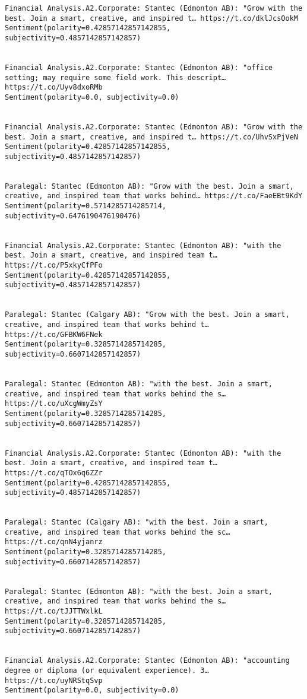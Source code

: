 \documentclass[11pt]{article}
\begin{document}
\begin{Verbatim}[commandchars=\\\{\}]
Financial Analysis.A2.Corporate: Stantec (Edmonton AB): "Grow with the best. Join a smart, creative, and inspired t… https://t.co/dklJcsOokM
Sentiment(polarity=0.42857142857142855, subjectivity=0.4857142857142857)


Financial Analysis.A2.Corporate: Stantec (Edmonton AB): "office setting; may require some field work. This descript… https://t.co/Uyv8dxoRMb
Sentiment(polarity=0.0, subjectivity=0.0)


Financial Analysis.A2.Corporate: Stantec (Edmonton AB): "Grow with the best. Join a smart, creative, and inspired t… https://t.co/UhvSxPjVeN
Sentiment(polarity=0.42857142857142855, subjectivity=0.4857142857142857)


Paralegal: Stantec (Edmonton AB): "Grow with the best. Join a smart, creative, and inspired team that works behind… https://t.co/FaeEBt9KdY
Sentiment(polarity=0.5714285714285714, subjectivity=0.6476190476190476)


Financial Analysis.A2.Corporate: Stantec (Edmonton AB): "with the best. Join a smart, creative, and inspired team t… https://t.co/P5xkyCfPFo
Sentiment(polarity=0.42857142857142855, subjectivity=0.4857142857142857)


Paralegal: Stantec (Calgary AB): "Grow with the best. Join a smart, creative, and inspired team that works behind t… https://t.co/GFBKW6FNek
Sentiment(polarity=0.3285714285714285, subjectivity=0.6607142857142857)


Paralegal: Stantec (Edmonton AB): "with the best. Join a smart, creative, and inspired team that works behind the s… https://t.co/uXcgWmyZsY
Sentiment(polarity=0.3285714285714285, subjectivity=0.6607142857142857)


Financial Analysis.A2.Corporate: Stantec (Edmonton AB): "with the best. Join a smart, creative, and inspired team t… https://t.co/qTOx6q6ZZr
Sentiment(polarity=0.42857142857142855, subjectivity=0.4857142857142857)


Paralegal: Stantec (Calgary AB): "with the best. Join a smart, creative, and inspired team that works behind the sc… https://t.co/qnN4yjanrz
Sentiment(polarity=0.3285714285714285, subjectivity=0.6607142857142857)


Paralegal: Stantec (Edmonton AB): "with the best. Join a smart, creative, and inspired team that works behind the s… https://t.co/tJJTTWxlkL
Sentiment(polarity=0.3285714285714285, subjectivity=0.6607142857142857)


Financial Analysis.A2.Corporate: Stantec (Edmonton AB): "accounting degree or diploma (or equivalent experience). 3… https://t.co/uyNRStqSvp
Sentiment(polarity=0.0, subjectivity=0.0)



\end{Verbatim}
\end{document}
